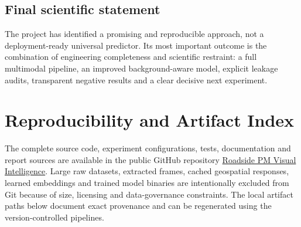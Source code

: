 \documentclass[11pt,a4paper,oneside]{report}
\newcommand{\projectrepository}{https://github.com/Kumaryan12/roadside-pm-visual-intelligence}
\begin{document}
\section{Final scientific statement}
The project has identified a promising and reproducible approach, not a
deployment-ready universal predictor. Its most important outcome is the
combination of engineering completeness and scientific restraint: a full
multimodal pipeline, an improved background-aware model, explicit leakage
audits, transparent negative results and a clear decisive next experiment.

\appendix

\chapter{Reproducibility and Artifact Index}

The complete source code, experiment configurations, tests, documentation and
report sources are available in the public GitHub repository
\href{\projectrepository}{Roadside PM Visual Intelligence}.
Large raw datasets, extracted frames, cached geospatial responses, learned
embeddings and trained model binaries are intentionally excluded from Git
because of size, licensing and data-governance constraints. The local artifact
paths below document exact provenance and can be regenerated using the
version-controlled pipelines.
\end{document}

